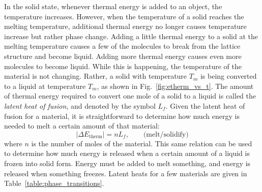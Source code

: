 \begin{table}
\begin{center}

\caption{Melting and vaporization temperatures for a few materials, along
with the latent heats of fusion and vaporization.}
\label{table:phase_transitions}
\end{center}
\end{table}

In the solid state, whenever thermal energy is added to an object, the
temperature increases.  However, when the temperature of a solid
reaches the melting temperature, additional thermal energy no longer
causes temperature increase but rather phase change.  Adding a little
thermal energy to a solid at the melting temperature causes a few of
the molecules to break from the lattice structure and become liquid.
Adding more thermal energy causes even more molecules to become
liquid.  While this is happening, the temperature of the material is
not changing.  Rather, a solid with temperature $T_m$ is being
converted to a liquid at temperature $T_m$, as shown in
Fig.~\ref{fig:etherm_vs_t}.  The amount of thermal energy required to
convert one mole of a solid to a liquid is called the {\it latent heat
  of fusion}, and denoted by the symbol $L_f$.  Given the latent heat
of fusion for a material, it is straightforward to determine how much
energy is needed to melt a certain amount of that material:
\begin{equation}
|\Delta E_\text{therm}| = nL_f,\qquad\text{(melt/solidify)}
\label{eq:latent_heat}
\end{equation}
where $n$ is the number of moles of the material.  This same relation
can be used to determine how much energy is released when a certain
amount of a liquid is frozen into solid form.  Energy must be added to
melt something, and energy is released when something freezes.  Latent
heats for a few materials are given in
Table~\ref{table:phase_transitions}.

